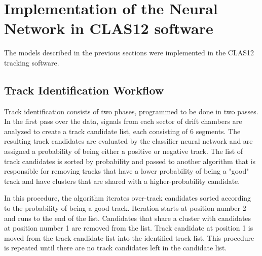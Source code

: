 \documentclass[aps,prl,preprint,12pt]{revtex4}
\begin{document}
\section{Implementation of the Neural Network in CLAS12 software}

The models described in the previous sections were implemented in the CLAS12 tracking software. 

\subsection{Track Identification Workflow}

 Track identification consists of two phases, programmed to be done in two passes. In the first pass 
 over the data, signals from each sector of drift chambers are analyzed to create a track candidate list, 
 each consisting of 6 segments. The resulting track candidates are evaluated by the classifier neural 
 network and are assigned a probability of being either a positive or negative track. The list of track 
 candidates is sorted by probability and passed to another algorithm that is responsible for removing 
 tracks that have a lower probability of being a "good" track and have clusters that are shared with a 
 higher-probability candidate. 

In this procedure, the algorithm iterates over-track candidates sorted according to the probability of 
being a good track. Iteration starts at position number 2 and runs to the end of the list. Candidates that 
share a cluster with candidates at position number 1 are removed from the list. Track candidate at position 
1 is moved from the track candidate list into the identified track list. This procedure is repeated until 
there are no track candidates left in the candidate list.
\end{document}
